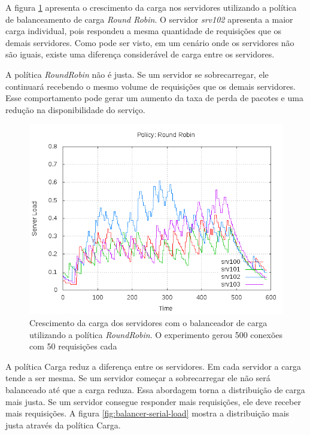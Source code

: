 A figura \ref{fig:balancer-serial-rr} apresenta o crescimento da carga nos 
servidores utilizando a política de balanceamento de carga \emph{Round Robin}.
O servidor \emph{srv102} apresenta a maior carga individual, pois respondeu
a mesma quantidade de requisições que os demais servidores.
Como pode ser visto, em um cenário onde os servidores não são iguais, existe
uma diferença considerável de carga entre os servidores.

A política \emph{RoundRobin} não é justa.
Se um servidor se sobrecarregar, ele continuará recebendo o mesmo volume de 
requisições que os demais servidores.
Esse comportamento pode gerar um aumento da taxa de perda de pacotes e uma 
redução na disponibilidade do serviço.

\begin{figure}[htb!]
    \centering
    \includegraphics[width=\linewidth]{img/balancer-serial-rr}
\caption{Crescimento da carga dos servidores com o balanceador de carga 
    utilizando a política \emph{RoundRobin}. O experimento gerou 500 conexões 
        com 50 requisições cada}
    \label{fig:balancer-serial-rr}
\end{figure}

A política Carga reduz a diferença entre os servidores.
Em cada servidor a carga tende a ser mesma.
Se um servidor começar a sobrecarregar ele não será balanceado até que a 
carga reduza. 
Essa abordagem torna a distribuição de carga mais justa.
Se um servidor consegue responder mais requisições, ele 
deve receber mais requisições.
A figura \ref{fig:balancer-serial-load} mostra a distribuição mais justa 
através da política Carga.
 
